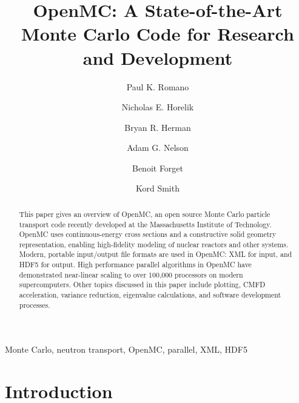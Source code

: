 \documentclass[5p,authoryear]{elsarticle}
\begin{document}
\title{OpenMC: A State-of-the-Art Monte Carlo Code for Research and Development}

\author[mit]{Paul K. Romano}

\author[mit]{Nicholas E. Horelik}

\author[mit]{Bryan R. Herman}

\author[umich]{Adam G. Nelson}

\author[mit]{Benoit Forget}

\author[mit]{Kord Smith}

\address[mit]{Massachusetts Institute of Technology, Department of Nuclear
  Science and Engineering \\ 77 Massachusetts Avenue, Cambridge, MA 02139}
\address[umich]{University of Michigan, Department of Nuclear Engineering and
  Radiological Sciences \\ 2355 Bonisteel Boulevard, Ann Arbor, MI 48104}

\begin{abstract}
  This paper gives an overview of OpenMC, an open source Monte Carlo
  particle transport code recently developed at the Massachusetts Institute of
  Technology. OpenMC uses continuous-energy cross sections and a constructive
  solid geometry representation, enabling high-fidelity modeling of nuclear
  reactors and other systems. Modern, portable input/output file formats are
  used in OpenMC: XML for input, and HDF5 for output. High performance parallel
  algorithms in OpenMC have demonstrated near-linear scaling to over 100,000
  processors on modern supercomputers. Other topics discussed in this paper
  include plotting, CMFD acceleration, variance reduction, eigenvalue
  calculations, and software development processes.
\end{abstract}

\begin{keyword}
  Monte Carlo, neutron transport, OpenMC, parallel, XML, HDF5
\end{keyword}

\maketitle

\section{Introduction}
\end{document}
